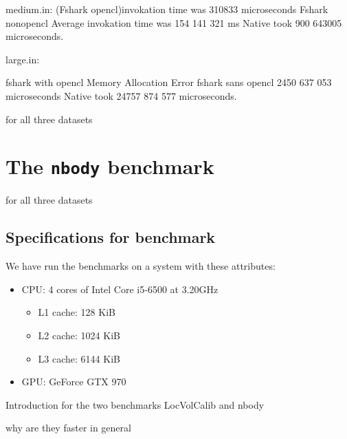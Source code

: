 medium.in:
(Fshark opencl)invokation time was 310833 microseconds
Fshark nonopencl Average invokation time was 154 141 321 ms
Native took 900 643005 microseconds.

large.in:

fshark with opencl Memory Allocation Error
fshark sans opencl 2450 637 053 microseconds
Native took 24757 874 577 microseconds.


for all three datasets



\section*{The \texttt{nbody} benchmark}

for all three datasets


\subsection*{Specifications for benchmark}
We have run the benchmarks on a system with these attributes:
\begin{itemize}
\item CPU: 4 cores of Intel Core i5-6500 at 3.20GHz
  \begin{itemize}
  \item L1 cache: 128 KiB 
  \item L2 cache: 1024 KiB 
  \item L3 cache: 6144 KiB 
  \end{itemize}
\item GPU: GeForce GTX 970
\end{itemize}


Introduction for the two benchmarks LocVolCalib and nbody



why are they faster in general





